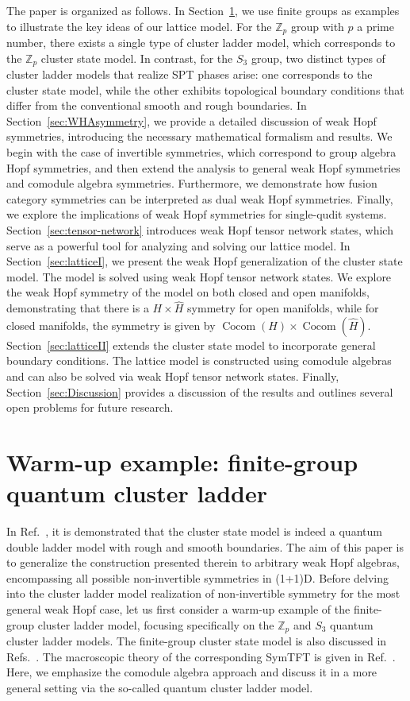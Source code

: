 \documentclass[a4paper,11pt]{article}
\theoremstyle{theorem}
\theoremstyle{remark}
\newcommand{\Cocom}{\operatorname{Cocom}}
\begin{document}
The paper is organized as follows. In Section~\ref{sec:groupcase}, we use finite groups as examples to illustrate the key ideas of our lattice model. For the $\mathbb{Z}_p$ group with $p$ a prime number, there exists a single type of cluster ladder model, which corresponds to the $\mathbb{Z}_p$ cluster state model. In contrast, for the $S_3$ group, two distinct types of cluster ladder models that realize SPT phases arise: one corresponds to the cluster state model, while the other exhibits topological boundary conditions that differ from the conventional smooth and rough boundaries.
In Section~\ref{sec:WHAsymmetry}, we provide a detailed discussion of weak Hopf symmetries, introducing the necessary mathematical formalism and results. We begin with the case of invertible symmetries, which correspond to group algebra Hopf symmetries, and then extend the analysis to general weak Hopf symmetries and comodule algebra symmetries. Furthermore, we demonstrate how fusion category symmetries can be interpreted as dual weak Hopf symmetries. Finally, we explore the implications of weak Hopf symmetries for single-qudit systems.  
Section~\ref{sec:tensor-network} introduces weak Hopf tensor network states, which serve as a powerful tool for analyzing and solving our lattice model.
In Section~\ref{sec:latticeI}, we present the weak Hopf generalization of the cluster state model. The model is solved using weak Hopf tensor network states. We explore the weak Hopf symmetry of the model on both closed and open manifolds, demonstrating that there is a $H \times \hat{H}$ symmetry for open manifolds, while for closed manifolds, the symmetry is given by $\Cocom(H) \times \Cocom(\hat{H})$.  
Section~\ref{sec:latticeII} extends the cluster state model to incorporate general boundary conditions. The lattice model is constructed using comodule algebras and can also be solved via weak Hopf tensor network states.  
Finally, Section~\ref{sec:Discussion} provides a discussion of the results and outlines several open problems for future research.



\section{Warm-up example: finite-group quantum cluster ladder}
\label{sec:groupcase}
In Ref.~\cite{jia2024generalized}, it is demonstrated that the cluster state model is indeed a quantum double ladder model with rough and smooth boundaries. The aim of this paper is to generalize the construction presented therein to arbitrary weak Hopf algebras, encompassing all possible non-invertible symmetries in (1+1)D.  
Before delving into the cluster ladder model realization of non-invertible symmetry for the most general weak Hopf case, let us first consider a warm-up example of the finite-group cluster ladder model, focusing specifically on the \(\mathbb{Z}_p\) and \(S_3\) quantum cluster ladder models. The finite-group cluster state model is also discussed in Refs.~\cite{brell2015generalized,fechisin2023noninvertible}. The macroscopic theory of the corresponding SymTFT is given in Ref.~\cite{huang2023topologicalholo}. Here, we emphasize the comodule algebra approach and discuss it in a more general setting via the so-called quantum cluster ladder model.
\end{document}
